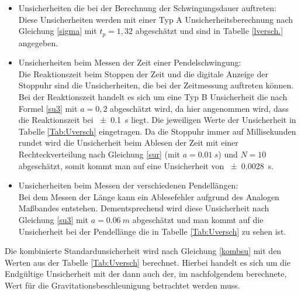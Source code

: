 \begin{itemize}
	\item Unsicherheiten die bei der Berechnung der Schwingungsdauer auftreten:\\
	Diese Unsicherheiten werden mit einer Typ A Unsicherheitsberechnung nach Gleichung \ref{sigma} mit $t_p = 1,32$ abgeschätzt und sind in Tabelle \ref{lversch.} angegeben.
	\item Unsicherheiten beim Messen der Zeit einer Pendelschwingung:\\
	Die Reaktionszeit beim Stoppen der Zeit und die digitale Anzeige der Stoppuhr sind die Unsicherheiten, die bei der Zeitmessung auftreten können. Bei der Reaktionszeit handelt es sich um eine Typ B Unsicherheit die nach Formel \ref{su3} mit $a=0,2$ abgeschätzt wird, da hier angenommen wird, dass die Reaktionszeit bei  \SI{+- 0,1}{s} liegt. Die jeweiligen Werte der Unsicherheit in Tabelle \ref{Tab:Uversch} eingetragen. Da die Stoppuhr immer auf Millisekunden rundet wird die Unsicherheit beim Ablesen der Zeit  mit einer Rechteckverteilung nach Gleichung \ref{sur} (mit $a=\SI{0,01}{s}$) und $N=10$ abgeschätzt,  somit kommt man auf eine Unsicherheit von \SI{+-0,0028}{s}.
	
	\item Unsicherheiten beim Messen der verschiedenen Pendellängen:\\
	Bei dem Messen der Länge kann ein Ablesefehler aufgrund des Analogen Maßbandes entstehen. Dementsprechend wird diese Unsicherheit nach Gleichung \ref{su3} mit $a= \SI{0,06}{m}$ abgeschätzt und man kommt auf die Unsicherheit bei der Pendellänge die in Tabelle \ref{Tab:Uversch} zu sehen ist. 
\end{itemize}
 Die kombinierte Standardunsicherheit wird nach Gleichung \ref{kombsu} mit den Werten  aus der Tabelle \ref{Tab:Uversch} berechnet.
 Hierbei handelt es sich um die Endgültige Unsicherheit mit der dann auch der, im nachfolgendem berechnete, Wert für die Gravitationsbeschleunigung betrachtet werden muss. 
 

